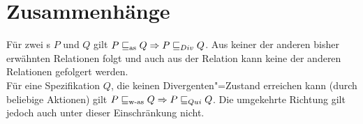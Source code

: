\section{Zusammenhänge}

\begin{Satz}
  \label{ZusammenhDivSatz}
  Für zwei \MEIO{}s $P$ und $Q$ gilt $P \sqsubseteq _{\mathrm{as}} Q \Rightarrow P  \sqsubseteq  _{Div} Q$. Aus
  keiner der anderen bisher erwähnten Relationen folgt \DRel{} und auch aus der
  Relation \DRel{} kann keine der anderen Relationen gefolgert werden.\\
  Für eine Spezifikation $Q$, die keinen Divergenten"=Zustand erreichen kann
  (durch beliebige Aktionen) gilt $P \sqsubseteq _{\mathrm{w}\text{-}\mathrm{as}} Q \Rightarrow P  \sqsubseteq  _{Qui} Q$. Die
  umgekehrte Richtung gilt jedoch auch unter dieser Einschränkung nicht.
\end{Satz}
